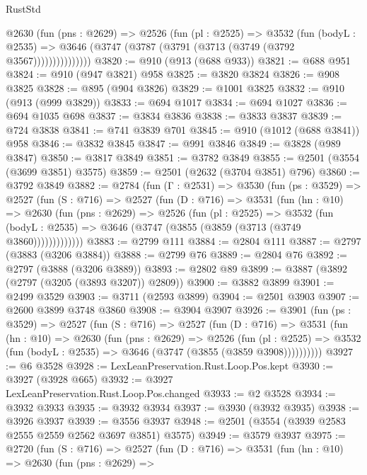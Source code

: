 \begin{lexlean}{RustStd}
\begin{coremodule}
              @2630
                (fun (pns : @2629) =>
                @2526
                  (fun (pl : @2525) =>
                  @3532
                    (fun (bodyL : @2535) =>
                    @3646 (@3747 (@3787 (@3791 (@3713 (@3749 (@3792 @3567)))))))))))))))
@3820 := @910 (@913 (@688 @933))
@3821 := @688 @951
@3824 := @910 (@947 @3821) @958
@3825 := @3820 @3824
@3826 := @908 @3825
@3828 := @895 (@904 @3826)
@3829 := @1001 @3825
@3832 := @910 (@913 (@999 @3829))
@3833 := @694 @1017
@3834 := @694 @1027
@3836 := @694 @1035 @698
@3837 := @3834 @3836
@3838 := @3833 @3837
@3839 := @724 @3838
@3841 := @741 @3839 @701
@3845 := @910 (@1012 (@688 @3841)) @958
@3846 := @3832 @3845
@3847 := @991 @3846
@3849 := @3828 (@989 @3847)
@3850 := @3817 @3849
@3851 := @3782 @3849
@3855 := @2501 (@3554 (@3699 @3851) @3575)
@3859 := @2501 (@2632 (@3704 @3851) @796)
@3860 := @3792 @3849
@3882 := @2784
    (fun (Γ : @2531) =>
    @3530
      (fun (ps : @3529) =>
      @2527
        (fun (S : @716) =>
        @2527
          (fun (D : @716) =>
          @3531
            (fun (hn : @10) =>
            @2630
              (fun (pns : @2629) =>
              @2526
                (fun (pl : @2525) =>
                @3532
                  (fun (bodyL : @2535) =>
                  @3646 (@3747 (@3855 (@3859 (@3713 (@3749 @3860)))))))))))))
@3883 := @2799 @111
@3884 := @2804 @111
@3887 := @2797 (@3883 (@3206 @3884))
@3888 := @2799 @76
@3889 := @2804 @76
@3892 := @2797 (@3888 (@3206 @3889))
@3893 := @2802 @89
@3899 := @3887 (@3892 (@2797 (@3205 (@3893 @3207)) @2809))
@3900 := @3882 @3899
@3901 := @2499 @3529
@3903 := @3711 (@2593 @3899)
@3904 := @2501 @3903
@3907 := @2600 @3899 @3748 @3860
@3908 := @3904 @3907
@3926 := @3901
    (fun (ps : @3529) =>
    @2527
      (fun (S : @716) =>
      @2527
        (fun (D : @716) =>
        @3531
          (fun (hn : @10) =>
          @2630
            (fun (pns : @2629) =>
            @2526
              (fun (pl : @2525) =>
              @3532 (fun (bodyL : @2535) => @3646 (@3747 (@3855 (@3859 @3908))))))))))
@3927 := @6 @3528
@3928 := LexLeanPreservation.Rust.Loop.Pos.kept
@3930 := @3927 (@3928 @665)
@3932 := @3927 LexLeanPreservation.Rust.Loop.Pos.changed
@3933 := @2 @3528
@3934 := @3932 @3933
@3935 := @3932 @3934
@3937 := @3930 (@3932 @3935)
@3938 := @3926 @3937
@3939 := @3556 @3937
@3948 := @2501 (@3554 (@3939 @2583 @2555 @2559 @2562 @3697 @3851) @3575)
@3949 := @3579 @3937
@3975 := @2720
    (fun (S : @716) =>
    @2527
      (fun (D : @716) =>
      @3531
        (fun (hn : @10) =>
        @2630
          (fun (pns : @2629) =>

\end{coremodule}
\end{lexlean}
